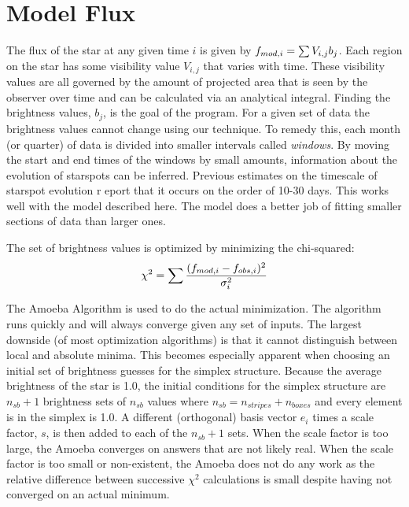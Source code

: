 

\section{Model Flux \label{flux}}
The flux of the star at any given time $i$ is given by $\mbox{$f_{mod,i}$} = \sum{V_{i,j} b_{j}}$. Each region on the star has some visibility value $V_{i,j}$ that varies with time. These visibility values are all governed by the amount of projected area that is seen by the observer over time and can be calculated via an analytical integral. Finding the brightness values, $b_j$, is the goal of the program. For a given set of data the brightness values cannot change using our technique. To remedy this, each month (or quarter) of data is divided into smaller intervals called {\it windows}. By moving the start and end times of the windows by small amounts, information about the evolution of starspots can be inferred. Previous estimates on the timescale of starspot evolution r eport that it occurs on the order of 10-30 days. This works well with the model described here. The model does a better job of fitting smaller sections of data than larger ones.

The set of brightness values is optimized by minimizing the chi-squared:
\begin{equation}
	\chi^2 = \sum \frac{(\mbox{$f_{mod,i}$} - \mbox{$f_{obs,i}$})^2}{\sigma_i^2}
\end{equation}

The Amoeba Algorithm is used to do the actual minimization. The algorithm runs quickly and will always converge given any set of inputs. The largest downside (of most optimization algorithms) is that it cannot distinguish between local and absolute minima. This becomes especially apparent when choosing an initial set of brightness guesses for the simplex structure. Because the average brightness of the star is 1.0, the initial conditions for the simplex structure are $n_{sb} + 1$ brightness sets of $n_{sb}$ values where $n_{sb} = n_{stripes} + n_{boxes}$ and every element is in the simplex is 1.0. A different (orthogonal) basis vector $e_i$ times a scale factor, $s$, is then added to each of the $n_{sb} + 1$ sets. When the scale factor is too large, the Amoeba converges on answers that are not likely real. When the scale factor is too small or non-existent, the Amoeba does not do any work as the relative difference between successive $\chi^2$ calculations is small despite having not converged on an actual minimum.
